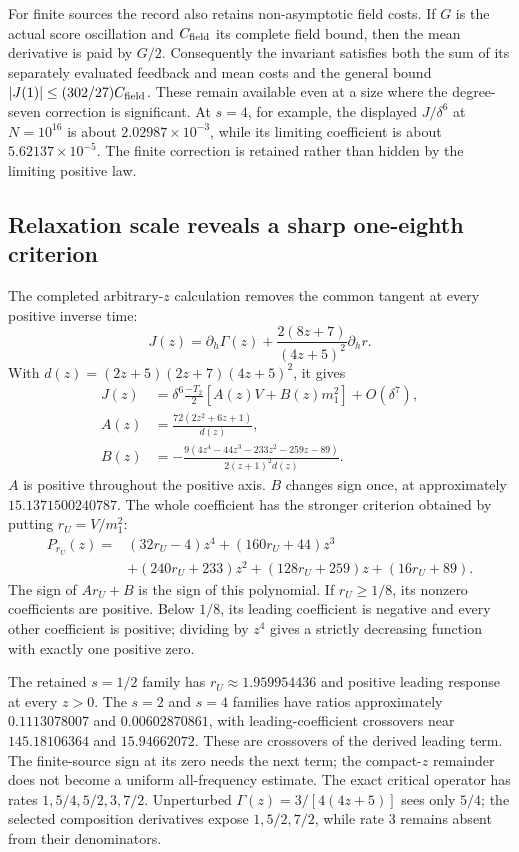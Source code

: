 For finite sources the record also retains non-asymptotic field costs. If $G$ is the actual score oscillation and $C_{\rm field}$ its complete field bound, then the mean derivative is paid by $G/2$. Consequently the invariant satisfies both the sum of its separately evaluated feedback and mean costs and the general bound $|J(1)|\leq(302/27)C_{\rm field}$. These remain available even at a size where the degree-seven correction is significant. At $s=4$, for example, the displayed $J/\delta^6$ at $N=10^{16}$ is about $2.02987\times10^{-3}$, while its limiting coefficient is about $5.62137\times10^{-5}$. The finite correction is retained rather than hidden by the limiting positive law.

\subsection{Relaxation scale reveals a sharp one-eighth criterion}

The completed arbitrary-$z$ calculation removes the common tangent at every positive inverse time:
\begin{equation}
 J(z)=\partial_h\Gamma(z)
 +\frac{2(8z+7)}{(4z+5)^2}\partial_hr.
\end{equation}
With $d(z)=(2z+5)(2z+7)(4z+5)^2$, it gives
\begin{align}
 J(z)&=\delta^6\frac{-T_2}{2}
 [A(z)V+B(z)m_1^2]+O(\delta^7),\\
 A(z)&=\frac{72(2z^2+6z+1)}{d(z)},\\
 B(z)&=-\frac{9(4z^4-44z^3-233z^2-259z-89)}
 {2(z+1)^2d(z)}.
\end{align}
$A$ is positive throughout the positive axis. $B$ changes sign once, at approximately $15.1371500240787$. The whole coefficient has the stronger criterion obtained by putting $r_U=V/m_1^2$:
\begin{align}
 P_{r_U}(z)={}&(32r_U-4)z^4+(160r_U+44)z^3\\
 &+(240r_U+233)z^2+(128r_U+259)z+(16r_U+89).
\end{align}
The sign of $A r_U+B$ is the sign of this polynomial. If $r_U\geq1/8$, its nonzero coefficients are positive. Below $1/8$, its leading coefficient is negative and every other coefficient is positive; dividing by $z^4$ gives a strictly decreasing function with exactly one positive zero.

The retained $s=1/2$ family has $r_U\approx1.959954436$ and positive leading response at every $z>0$. The $s=2$ and $s=4$ families have ratios approximately $0.1113078007$ and $0.00602870861$, with leading-coefficient crossovers near $145.18106364$ and $15.94662072$. These are crossovers of the derived leading term. The finite-source sign at its zero needs the next term; the compact-$z$ remainder does not become a uniform all-frequency estimate. The exact critical operator has rates $1,5/4,5/2,3,7/2$. Unperturbed $\Gamma(z)=3/[4(4z+5)]$ sees only $5/4$; the selected composition derivatives expose $1,5/2,7/2$, while rate $3$ remains absent from their denominators.

